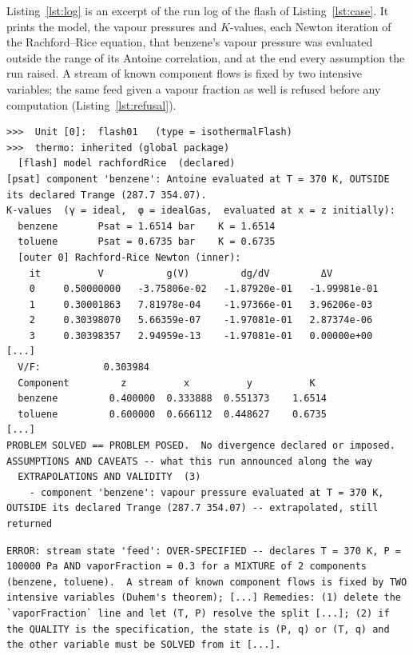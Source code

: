 \documentclass[preprint,12pt]{elsarticle}
\begin{document}
Listing~\ref{lst:log} is an excerpt of the run log of the flash of
Listing~\ref{lst:case}.  It prints the model, the vapour pressures and
$K$-values, each Newton iteration of the Rachford--Rice equation, that
benzene's vapour pressure was evaluated outside the range of its Antoine
correlation, and at the end every assumption the run raised.  A stream of
known component flows is fixed by two intensive variables; the same feed
given a vapour fraction as well is refused before any computation
(Listing~\ref{lst:refusal}).

\begin{lstlisting}[caption={Excerpt of the run log of the flash
  (\texttt{verbosity 3}); elided lines marked \texttt{[...]}.},label=lst:log,
  breaklines=true, breakindent=0pt]
>>>  Unit [0]:  flash01   (type = isothermalFlash)
>>>  thermo: inherited (global package)
  [flash] model rachfordRice  (declared)
[psat] component 'benzene': Antoine evaluated at T = 370 K, OUTSIDE its declared Trange (287.7 354.07).
K-values  (γ = ideal,  φ = idealGas,  evaluated at x = z initially):
  benzene       Psat = 1.6514 bar    K = 1.6514
  toluene       Psat = 0.6735 bar    K = 0.6735
  [outer 0] Rachford-Rice Newton (inner):
    it          V           g(V)         dg/dV         ΔV
    0     0.50000000   -3.75806e-02   -1.87920e-01   -1.99981e-01
    1     0.30001863   7.81978e-04    -1.97366e-01   3.96206e-03
    2     0.30398070   5.66359e-07    -1.97081e-01   2.87374e-06
    3     0.30398357   2.94959e-13    -1.97081e-01   0.00000e+00
[...]
  V/F:           0.303984
  Component         z          x          y          K
  benzene         0.400000  0.333888  0.551373    1.6514
  toluene         0.600000  0.666112  0.448627    0.6735
[...]
PROBLEM SOLVED == PROBLEM POSED.  No divergence declared or imposed.
ASSUMPTIONS AND CAVEATS -- what this run announced along the way
  EXTRAPOLATIONS AND VALIDITY  (3)
    - component 'benzene': vapour pressure evaluated at T = 370 K, OUTSIDE its declared Trange (287.7 354.07) -- extrapolated, still returned
\end{lstlisting}

\begin{lstlisting}[caption={A refusal by name (the feed of
  Listing~\ref{lst:case} with \texttt{vaporFraction 0.3;} added); exit
  status 2.},label=lst:refusal, breaklines=true, breakindent=0pt]
ERROR: stream state 'feed': OVER-SPECIFIED -- declares T = 370 K, P = 100000 Pa AND vaporFraction = 0.3 for a MIXTURE of 2 components (benzene, toluene).  A stream of known component flows is fixed by TWO intensive variables (Duhem's theorem); [...] Remedies: (1) delete the `vaporFraction` line and let (T, P) resolve the split [...]; (2) if the QUALITY is the specification, the state is (P, q) or (T, q) and the other variable must be SOLVED from it [...].
\end{lstlisting}
\end{document}
